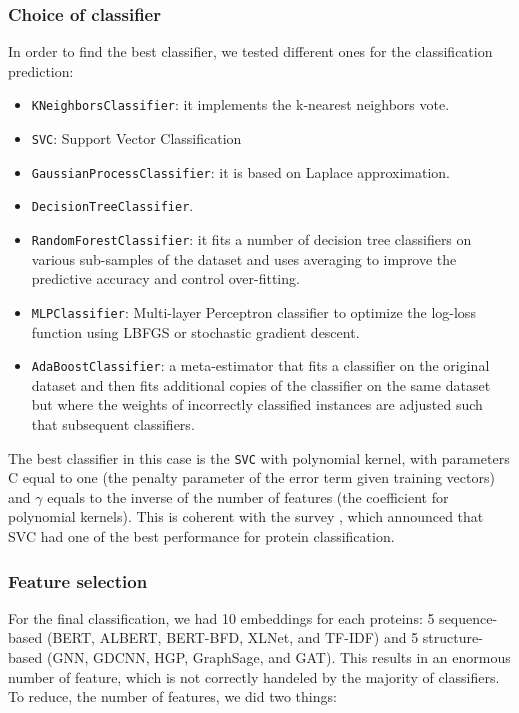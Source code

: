 \documentclass[final]{cvpr}
\begin{document}
\subsubsection{Choice of classifier}

In order to find the best classifier, we tested different ones for the classification prediction:

\begin{itemize}
    \item \texttt{KNeighborsClassifier}: it implements the k-nearest neighbors vote.
    \item \texttt{SVC}: Support Vector Classification
    \item \texttt{GaussianProcessClassifier}: it is based on Laplace approximation.
    \item \texttt{DecisionTreeClassifier}.
    \item \texttt{RandomForestClassifier}: it fits a number of decision tree classifiers on various sub-samples of the dataset and uses averaging to improve the predictive accuracy and control over-fitting.
    \item \texttt{MLPClassifier}: Multi-layer Perceptron classifier to optimize the log-loss function using LBFGS or stochastic gradient descent.
    \item \texttt{AdaBoostClassifier}: a meta-estimator that fits a classifier on the original dataset and then fits additional copies of the classifier on the same dataset but where the weights of incorrectly classified instances are adjusted such that subsequent classifiers.
\end{itemize} 

The best classifier in this case is the \texttt{SVC} with polynomial kernel, with parameters C equal to one (the penalty parameter of the error term given training vectors) and $\gamma$ equals to the inverse of the number of features (the coefficient for polynomial kernels). This is coherent with the survey \cite{surveyClassifProt}, which announced that SVC had one of the best performance for protein classification.

\subsubsection{Feature selection} \label{sec:featureSelection}

For the final classification, we had 10 embeddings for each proteins: 5 sequence-based (BERT, ALBERT, BERT-BFD, XLNet, and TF-IDF) and 5 structure-based (GNN, GDCNN, HGP, GraphSage, and GAT). This results in an enormous number of feature, which is not correctly handeled by the majority of classifiers. To reduce, the number of features, we did two things:
\end{document}
